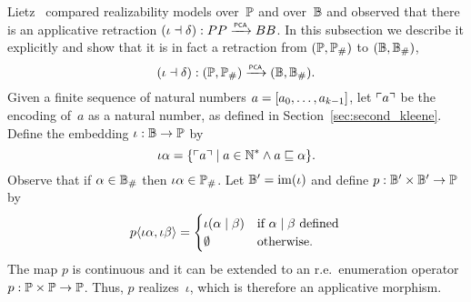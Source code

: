 %
%

Lietz~\cite{Lietz:99} compared realizability models over~$\mathbb{P}$ and
over~$\mathbb{B}$ and observed that there is an applicative retraction
$(\iota \dashv \delta): PP \xrightarrow{\scriptscriptstyle\mathsf{PCA}}{} BB$. In this subsection we
describe it explicitly and show that it is in fact a retraction from
$(\mathbb{P}, \mathbb{P}_{\#})$ to $(\mathbb{B}, \mathbb{B}_{\#})$,
\begin{equation*}
  (\iota \dashv \delta): (\mathbb{P}, \mathbb{P}_{\#}) \xrightarrow{\scriptscriptstyle\mathsf{PCA}}{} (\mathbb{B}, \mathbb{B}_{\#}).
\end{equation*}
Given a finite sequence of natural numbers $a = [a_0, \ldots,
  a_{k-1}]$, let $\ulcorner a \urcorner$ be the encoding of~$a$ as a natural
number, as defined in Section~\ref{sec:second_kleene}. Define the
embedding $\iota: \mathbb{B} \to \mathbb{P}$ by
\begin{equation*}
  \iota \alpha =
  \{ \ulcorner a \urcorner \mid
    a \in \mathbb{N}^{*} \land a  \sqsubseteq \alpha 
    \}.
\end{equation*}
Observe that if $\alpha \in \mathbb{B}_{\#}$ then $\iota \alpha \in \mathbb{P}_{\#}$.
Let $\mathbb{B}' = \mathrm{im}(\iota)$ and define $p: \mathbb{B}' \times \mathbb{B}' \to \mathbb{P}$
by
\begin{equation*}
  p \langle \iota \alpha, \iota \beta \rangle =
  \begin{cases}
    \iota (\alpha \mid \beta) 
    & \text{if $\alpha \mid \beta$ defined} \,\\
    \emptyset
    & \text{otherwise}.
  \end{cases}
\end{equation*}
The map $p$ is continuous and it can be extended to an
r.e.~enumeration operator $p: \mathbb{P} \times \mathbb{P} \to \mathbb{P}$. Thus, $p$
realizes~$\iota$, which is therefore an applicative morphism.


